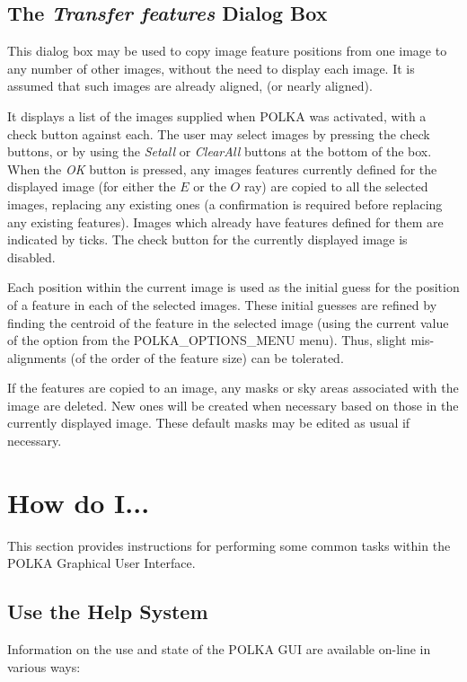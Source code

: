 \subsection {The {\em Transfer features} Dialog Box}
This dialog box may be used to copy image feature positions from one
image to any number of other images, without the need to display each
image. It is assumed that such images are already aligned, (or nearly
aligned).

It displays a list of the images supplied when POLKA was activated, with
a check button against each. The user may select images by pressing the
check buttons, or by using the {\em Setall} or {\em ClearAll} buttons at
the bottom of the box. When the {\em OK} button is pressed, any images
features currently defined for the displayed image (for either the $E$ or
the $O$ ray) are copied to all the selected images, replacing any
existing ones (a confirmation is required before replacing any existing
features). Images which already have features defined for them are
indicated by ticks. The check button for the currently displayed image is
disabled.

Each position within the current image is used as the initial guess for
the position of a feature in each of the selected images. These initial
guesses are refined by finding the centroid of the feature in the
selected image (using the current value of the  option from the 
{POLKA_OPTIONS_MENU} menu). Thus, slight mis-alignments (of the order of
the feature size) can be tolerated.

If the features are copied to an image, any masks or sky areas associated
with the image are deleted. New ones will be created when necessary based
on those in the currently displayed image. These default masks may be
edited as usual if necessary.

\section {How do I...}
This section provides instructions for performing some common tasks
within the POLKA Graphical User Interface.

\subsection {Use the Help System}
Information on the use and state of the POLKA GUI are available on-line
in various ways:

